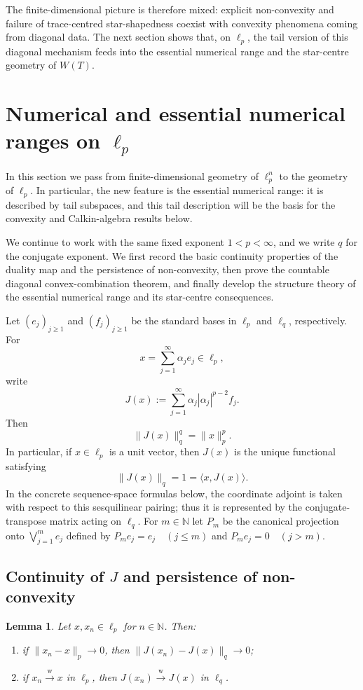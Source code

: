 \documentclass[11pt]{amsart}
\numberwithin{equation}{section}
\newtheorem{lemma}[theorem]{Lemma}
\theoremstyle{definition}
\theoremstyle{remark}
\newcommand{\N}{\mathbb{N}}
\newcommand{\ip}[2]{\langle #1,#2\rangle}
\newcommand{\wto}{\xrightarrow{\mathrm w}}
\begin{document}
The finite-dimensional picture is therefore mixed: explicit non-convexity and
failure of trace-centred star-shapedness coexist with convexity phenomena coming
from diagonal data. The next section shows that, on \(\ell_p\), the tail
version of this diagonal mechanism feeds into the essential numerical range
and the star-centre geometry of \(W(T)\).

\section{Numerical and essential numerical ranges on $\ell_p$}\label{inflp}

In this section we pass from finite-dimensional geometry of \(\ell_p^n\) to
the geometry of \(\ell_p\). In particular, the new feature is the
essential numerical range: it is described by tail subspaces, and this tail
description will be the basis for the convexity and Calkin-algebra results
below.


We continue to work with the same fixed exponent $1<p<\infty$, and we write $q$ for the conjugate exponent. We first record the basic continuity properties of the duality map and the persistence of non-convexity, then prove the countable diagonal convex-combination theorem, and finally develop the structure theory of the essential numerical range and its star-centre consequences.

Let $(e_j)_{j \ge 1}$ and $(f_j)_{j \ge 1}$ be the standard bases in $\ell_p$ and $\ell_q$, respectively.
For
\[
x=\sum_{j=1}^\infty \alpha_j e_j\in \ell_p,
\]
write
\[
J(x):=\sum_{j=1}^\infty \alpha_j|\alpha_j|^{p-2}f_j.
\]
Then
\[
\|J(x)\|_q^q=\|x\|_p^p.
\]
In particular, if $x\in\ell_p$ is a unit vector, then $J(x)$ is the unique functional satisfying
\[
\|J(x)\|_q=1=\ip{x}{J(x)}.
\]
In the concrete sequence-space formulas below, the coordinate adjoint is taken with respect to this sesquilinear pairing; thus it is represented by the conjugate-transpose matrix acting on $\ell_q$.
For $m\in\N$ let $P_m$ be the canonical projection onto $\bigvee_{j=1}^m e_j$ defined by $P_me_j=e_j\quad(j\le m)$ and $P_me_j=0\quad(j>m)$.


\subsection{Continuity of $J$ and persistence of non-convexity}

\begin{lemma}\label{thm:J-ellp}
Let $x,x_n\in \ell_p$ for $n\in\N$. Then:
\begin{enumerate}[label=\textup{(\roman*)}]
\item if $\|x_n-x\|_p\to 0$, then $\|J(x_n)-J(x)\|_q\to 0$;
\item if $x_n\wto x$ in $\ell_p$, then $J(x_n)\wto J(x)$ in $\ell_q$.
\end{enumerate}
\end{lemma}
\end{document}
